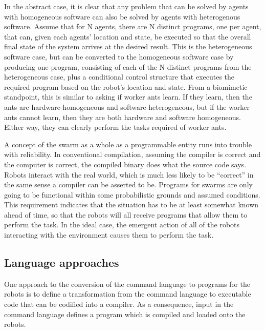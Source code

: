 \documentclass[]{article}
\begin{document}
In the abstract case, it is clear that any problem that can be solved by agents with homogeneous software can also be solved by agents with heterogenous software. 
Assume that for N agents, there are N distinct programs, one per agent, that can, given each agents' location and state, be executed so that the overall final state of the system arrives at the desired result. 
This is the heterogeneous software case, but can be converted to the homogeneous software case by producing one program, consisting of each of the N distinct programs from the heterogeneous case, plus a conditional control structure that executes the required program based on the robot's location and state.  
From a biomimetic standpoint, this is similar to asking if worker ants learn. 
If they learn, then the ants are hardware-homogeneous and software-heterogeneous, but if the worker ants cannot learn, then they are both hardware and software homogeneous. Either way, they can clearly perform the tasks required of worker ants. 

A concept of the swarm as a whole as a programmable entity runs into trouble with reliability. 
In conventional compilation, assuming the compiler is correct and the computer is correct, the compiled binary does what the source code says. 
Robots interact with the real world, which is much less likely to be ``correct'' in the same sense a compiler can be asserted to be. 
Programs for swarms are only going to be functional within some probabilistic grounds and assumed conditions. 
This requirement indicates that the situation has to be at least somewhat known ahead of time, so that the robots will all receive programs that allow them to perform the task.
In the ideal case, the emergent action of all of the robots interacting with the environment causes them to perform the task. 

\subsection {Language approaches}

One approach to the conversion of the command language to programs for the robots is to define a transformation from the command language to executable code that can be codified into a compiler. 
As a consequence, input in the command language defines a program which is compiled and loaded onto the robots. 
\end{document}
